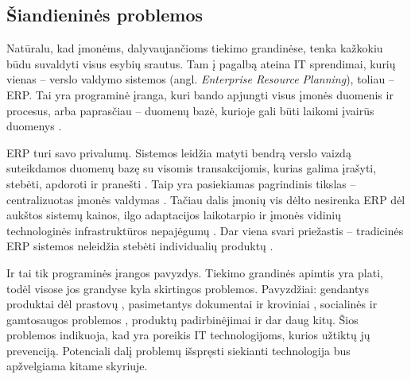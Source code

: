 
\subsection{Šiandieninės problemos}

Natūralu, kad įmonėms, dalyvaujančioms tiekimo grandinėse, tenka kažkokiu būdu suvaldyti visus esybių srautus. Tam į pagalbą ateina IT sprendimai, kurių vienas – verslo valdymo sistemos (angl. \textit{Enterprise Resource Planning}), toliau – ERP. Tai yra programinė įranga, kuri bando apjungti visus įmonės duomenis ir procesus, arba paprasčiau – duomenų bazė, kurioje gali būti laikomi įvairūs duomenys \cite{ozcan2016software}. 

ERP turi savo privalumų. Sistemos leidžia matyti bendrą verslo vaizdą suteikdamos duomenų bazę su visomis transakcijomis, kurias galima įrašyti, stebėti, apdoroti ir pranešti \cite{neubert2018collaboration}. Taip yra pasiekiamas pagrindinis tikslas – centralizuotas įmonės valdymas \cite{ozcan2016software}. Tačiau dalis įmonių vis dėlto nesirenka ERP dėl aukštos sistemų kainos, ilgo adaptacijos laikotarpio ir įmonės vidinių technologinės infrastruktūros nepajėgumų \cite{ozcan2016software}. Dar viena svari priežastis – tradicinės ERP sistemos neleidžia stebėti individualių produktų \cite{garg2018supply}. 

Ir tai tik programinės įrangos pavyzdys. Tiekimo grandinės apimtis yra plati, todėl visose jos grandyse kyla skirtingos problemos. Pavyzdžiai: gendantys produktai dėl prastovų \cite{briano2010resiliency}, pasimetantys dokumentai ir kroviniai \cite{huber2007vendor}, socialinės ir gamtosaugos problemos \cite{mani2015supply} \cite{vachon2006extending}, produktų padirbinėjimai \cite{huber2007vendor} ir dar daug kitų. Šios problemos indikuoja, kad yra poreikis IT technologijoms, kurios užtiktų jų prevenciją. Potenciali dalį problemų išspręsti siekianti technologija bus apžvelgiama kitame skyriuje.